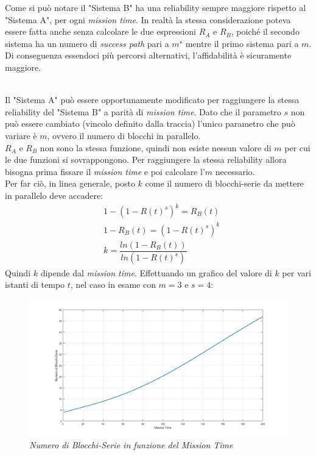 Come si può notare il "Sistema B" ha una reliability sempre maggiore rispetto al "Sistema A", per ogni \textit{mission time}. In realtà la stessa considerazione poteva essere fatta anche senza calcolare le due espressioni $R_A$ e $R_B$, poiché il secondo sistema ha un numero di \textit{success path} pari a $m^s$ mentre il primo sistema pari a $m$. Di conseguenza essendoci più percorsi alternativi, l'affidabilità è sicuramente maggiore.

\vspace{0.5cm}
\\Il "Sistema A" può essere opportunamente modificato per raggiungere la stessa reliability del "Sistema B" a parità di \textit{mission time}. Dato che il parametro $s$ non può essere cambiato (vincolo definito dalla traccia) l'unico parametro che può variare è $m$, ovvero il numero di blocchi in parallelo. 
\\$R_A$ e $R_B$ non sono la stessa funzione, quindi non esiste nessun valore di $m$ per cui le due funzioni si sovrappongono. Per raggiungere la stessa reliability allora bisogna prima fissare il \textit{mission time} e poi calcolare l'$m$ necessario. \\Per far ciò, in linea generale, posto $k$ come il numero di blocchi-serie da mettere in parallelo deve accadere:
\begin{equation}
	\begin{split}
		&1-(1-R(t)^s)^k = R_B(t) \\
		&1-R_B(t) = (1-R(t)^s)^k \\
		&k = \dfrac{ln(1-R_B(t))}{ln(1-R(t)^s)} 
	\end{split}
\end{equation}
Quindi $k$ dipende dal \textit{mission time}. Effettuando un grafico del valore di $k$ per vari istanti di tempo $t$, nel caso in esame con $m=3$ e $s=4$:
\begin{figure}[H]
	\centering
	\includegraphics[width=\textwidth]{img/hw5/es2_grafico2.png}
	\caption{\textit{Numero di Blocchi-Serie in funzione del Mission Time}}
\end{figure}
